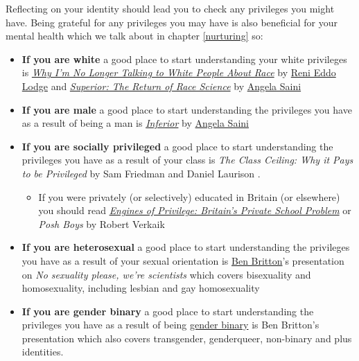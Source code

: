 \documentclass[
]{book}
\providecommand{\tightlist}{%
  \setlength{\itemsep}{0pt}\setlength{\parskip}{0pt}}
\begin{document}
Reflecting on your identity should lead you to check any privileges you might have. Being grateful for any privileges you may have is also beneficial for your mental health which we talk about in chapter \ref{nurturing} so:

\begin{itemize}
\tightlist
\item
  \textbf{If you are white} a good place to start understanding your white privileges is \emph{\href{https://en.wikipedia.org/wiki/Why_I'm_No_Longer_Talking_to_White_People_About_Race}{Why I'm No Longer Talking to White People About Race}} by \href{https://en.wikipedia.org/wiki/Reni_Eddo-Lodge}{Reni Eddo Lodge} \citep{nottalking} and \emph{\href{https://en.wikipedia.org/wiki/Superior:_The_Return_of_Race_Science}{Superior: The Return of Race Science}} by \href{https://en.wikipedia.org/wiki/Angela_Saini}{Angela Saini}
\item
  \textbf{If you are male} a good place to start understanding the privileges you have as a result of being a man is \emph{\href{https://en.wikipedia.org/wiki/Inferior_(book)}{Inferior}} by \href{https://en.wikipedia.org/wiki/Angela_Saini}{Angela Saini} \citep{inferior}
\item
  \textbf{If you are socially privileged} a good place to start understanding the privileges you have as a result of your class is \emph{The Class Ceiling: Why it Pays to be Privileged} by Sam Friedman and Daniel Laurison \citep{classceiling}.

  \begin{itemize}
  \tightlist
  \item
    If you were privately (or selectively) educated in Britain (or elsewhere) you should read \emph{\href{https://en.wikipedia.org/wiki/Engines_of_Privilege}{Engines of Privilege: Britain's Private School Problem}} \citep{nicebutdim} or \emph{Posh Boys} by Robert Verkaik \citep{poshboys}
  \end{itemize}
\item
  \textbf{If you are heterosexual} a good place to start understanding the privileges you have as a result of your sexual orientation is \href{https://en.wikipedia.org/wiki/Ben_Britton}{Ben Britton}'s presentation on \emph{No sexuality please, we're scientists} \citep{nosex} which covers bisexuality and homosexuality, including lesbian and gay homosexuality
\item
  \textbf{If you are gender binary} a good place to start understanding the privileges you have as a result of being \href{https://en.wikipedia.org/wiki/Gender_binary}{gender binary} is Ben Britton's presentation \citep{nosex} which also covers transgender, genderqueer, non-binary and plus identities.
\end{itemize}
\end{document}
